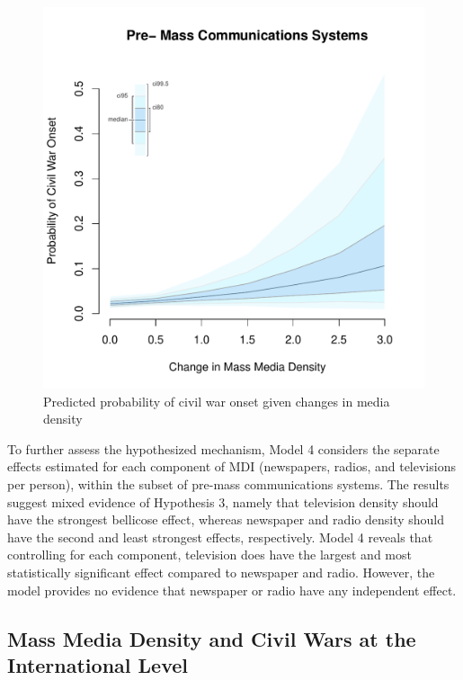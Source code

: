 \documentclass[11pt,article,oneside]{memoir}
\makeatletter
\def\maxwidth{\ifdim\Gin@nat@width>\linewidth\linewidth
\else\Gin@nat@width\fi}
\let\Oldincludegraphics\includegraphics
\renewcommand{\includegraphics}[1]{\Oldincludegraphics[width=\maxwidth]{#1}}
\makeatother
\begin{document}
\clearpage

\begin{figure} 
\includegraphics{figure/d_mdi_effect.pdf} 
\caption{Predicted probability of civil war onset given changes in media density} 
\label{myFigz} 
\end{figure}

To further assess the hypothesized mechanism, Model 4 considers the
separate effects estimated for each component of MDI (newspapers,
radios, and televisions per person), within the subset of pre-mass
communications systems. The results suggest mixed evidence of Hypothesis
3, namely that television density should have the strongest bellicose
effect, whereas newspaper and radio density should have the second and
least strongest effects, respectively. Model 4 reveals that controlling
for each component, television does have the largest and most
statistically significant effect compared to newspaper and radio.
However, the model provides no evidence that newspaper or radio have any
independent effect.

\subsection{Mass Media Density and Civil Wars at the International
Level}\label{mass-media-density-and-civil-wars-at-the-international-level}
\end{document}

